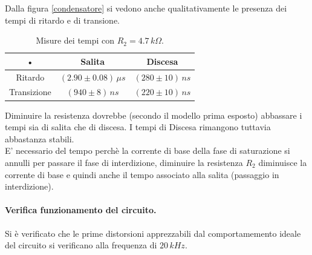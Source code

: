 \documentclass[10pt,a4paper]{article}
\begin{document}
Dalla figura \ref{condensatore} si vedono anche qualitativamente le presenza dei tempi di ritardo e di transione.\\

\begin{table}[!htb]\centering
\begin{tabular}{|c|c|c|}
\hline 
• & Salita & Discesa \\ 
\hline 
Ritardo & $(2.90\pm0.08)\, \mu s$ & $(280\pm10) \, ns$ \\ 
\hline 
Transizione & $(940\pm8)\,ns$ & $(220\pm10) \, ns$ \\ 
\hline 
\end{tabular} 
\caption{Misure dei tempi con $R_2 = 4.7 \, k\Omega$.} \label{tempi2}
\end{table}

Diminuire la resistenza dovrebbe (secondo il modello prima esposto) abbassare i tempi sia di salita che di discesa. I tempi di Discesa rimangono tuttavia abbastanza stabili.\\
E' necessario del tempo perchè la corrente di base della fase di saturazione si annulli per passare il fase di interdizione, diminuire la resistenza $R_2$ diminuisce la corrente di base e quindi anche il tempo associato alla salita (passaggio in interdizione).

\paragraph{Verifica funzionamento del circuito.}
Si è verificato che le prime distorsioni apprezzabili dal comportamemento ideale del circuito si verificano alla frequenza di $20 \, kHz$.
\end{document}
